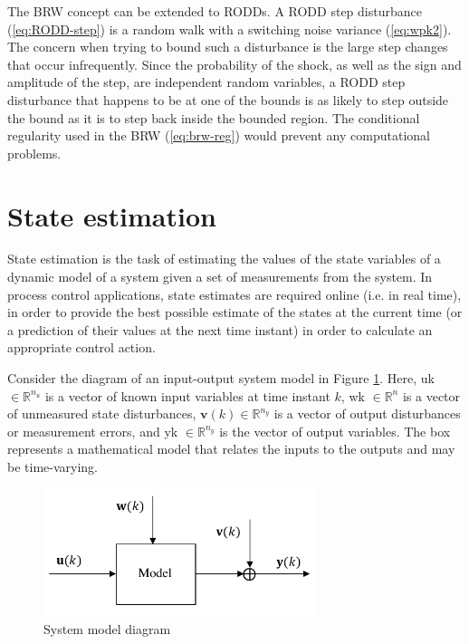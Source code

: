 The BRW concept can be extended to RODDs. A RODD step disturbance (\ref{eq:RODD-step}) is a random walk with a switching noise variance (\ref{eq:wpk2}). The concern when trying to bound such a disturbance is the large step changes that occur infrequently. Since the probability of the shock, as well as the sign and amplitude of the step, are independent random variables, a RODD step disturbance that happens to be at one of the bounds is as likely to step outside the bound as it is to step back inside the bounded region. The conditional regularity used in the BRW (\ref{eq:brw-reg}) would prevent any computational problems. 



\section{State estimation}

State estimation is the task of estimating the values of the state variables of a dynamic model of a system given a set of measurements from the system. In process control applications, state estimates are required online (i.e. in real time), in order to provide the best possible estimate of the states at the current time (or a prediction of their values at the next time instant) in order to calculate an appropriate control action.

Consider the diagram of an input-output system model in Figure \ref{fig:model_diag_uwvy}. Here, \gls{uk} $\in \mathbb{R}^{n_u}$ is a vector of known input variables at time instant $k$, \gls{wk} $\in \mathbb{R}^n$ is a vector of unmeasured state disturbances, $\mathbf{v}(k) \in \mathbb{R}^{n_y}$ is a vector of output disturbances or measurement errors, and \gls{yk} $\in \mathbb{R}^{n_y}$ is the vector of output variables. The box represents a mathematical model that relates the inputs to the outputs and may be time-varying. 
\begin{figure}[htp]
	\centering
	\includegraphics[width=8cm]{images/model_diag_uwvy.pdf}
	\caption{System model diagram}
	\label{fig:model_diag_uwvy}
\end{figure}

